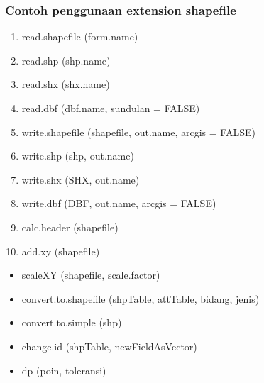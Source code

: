 \subsubsection{Contoh penggunaan extension shapefile}
\begin{enumerate}
    \item read.shapefile (form.name) 
    \item read.shp (shp.name) 
    \item read.shx (shx.name)
    \item read.dbf (dbf.name, sundulan = FALSE)
    \item write.shapefile (shapefile, out.name, arcgis = FALSE) 
    \item write.shp (shp, out.name) 
    \item write.shx (SHX, out.name)
    \item write.dbf (DBF, out.name, arcgis = FALSE) 
    \item calc.header (shapefile) 
    \item add.xy (shapefile)
\end{enumerate}
\begin{itemize}
    \item scaleXY (shapefile, scale.factor)
    \item convert.to.shapefile (shpTable, attTable, bidang, jenis) 
    \item convert.to.simple (shp)
    \item change.id (shpTable, newFieldAsVector) 
    \item dp (poin, toleransi)
\end{itemize}

